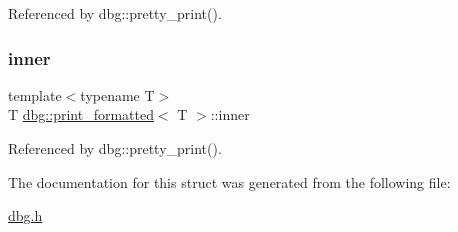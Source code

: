 Referenced by dbg\+::pretty\+\_\+print().

\mbox{\label{structdbg_1_1print__formatted_a080056e4f7af0c86ed46bc2ecb9c6f1e}} 
\subsubsection{\texorpdfstring{inner}{inner}}
{\footnotesize\ttfamily template$<$typename T$>$ \\
T \hyperlink{structdbg_1_1print__formatted}{dbg\+::print\+\_\+formatted}$<$ T $>$\+::inner}



Referenced by dbg\+::pretty\+\_\+print().



The documentation for this struct was generated from the following file\+:\begin{DoxyCompactItemize}
\item 
\hyperlink{dbg_8h}{dbg.\+h}\end{DoxyCompactItemize}
